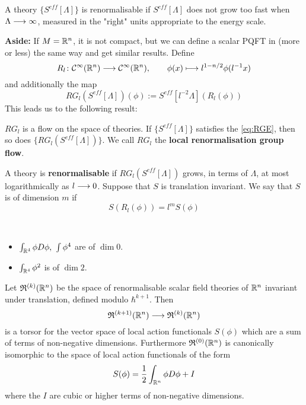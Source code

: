 \begin{principle}
  A theory $\{S^{eff}[\Lambda]\}$ is renormalisable if $S^{eff}[\Lambda]$ does not grow too fast when $\Lambda \longrightarrow \infty$, measured in the "right" units appropriate to the energy scale.
\end{principle}


\textbf{Aside:} If $M = \mathbb{R}^n$, it is not compact, but we can define a scalar PQFT in (more or less) the same way and get similar results. Define
\begin{equation} R_l \colon \Ci(\RR^n) \lra \Ci(\RR^n), \quad \quad \phi(x) \lmap l^{1-n/2} \phi(l^{-1} x)\end{equation}
and additionally the map
\begin{equation} RG_l (S^{eff}[\Lambda]) (\phi) := S^{eff}[l^{-2} \Lambda](R_l(\phi))\end{equation}
This leads us to the following result:

\begin{lem}
  $RG_l$ is a flow on the space of theories. If $ \{S^{eff}[\Lambda]\}$ satisfies the \eqref{eq:RGE}, then so does $\{RG_l(S^{eff}[\Lambda])\}$. We call $RG_l$ the \textbf{local renormalisation group flow}.
\end{lem}


\begin{definition}
  A theory is \textbf{renormalisable} if $RG_l(S^{eff}[\Lambda])$ grows, in terms of $\Lambda$, at most logarithmically as $l \longrightarrow 0$. Suppose that $S$ is translation invariant. We say that $S$ is of dimension $m$ if
  \begin{equation}S(R_l(\phi)) = l^m S(\phi)\end{equation}
\end{definition}

\begin{example}~
  \begin{itemize}
    \item $\int_{\RR^4} \phi D \phi, \ \int \phi^4$ are of $\dim 0$.
    \item $\int_{\RR^4} \phi^2$ is of $\dim 2$.
  \end{itemize}
\end{example}

\begin{theo}
  Let $\mathfrak{R}^{(k)}(\mathbb{R}^n)$ be the space of renormalisable scalar field theories of $\mathbb{R}^n$ invariant under translation, defined modulo $\hbar^{k+1}$. Then
  \begin{equation} \mathfrak{R}^{(k+1)}(\mathbb{R}^n) \longrightarrow \mathfrak{R}^{(k)}(\mathbb{R}^n)\end{equation}
  is a torsor for the vector space of local action functionals $S(\phi)$ which are a sum of terms of non-negative dimensions. Furthermore $\mathfrak{R}^{(0)}(\mathbb{R}^n)$ is canonically isomorphic to the space of local action functionals of the form
  \begin{equation}S(\phi) = \frac{1}{2} \int_{\RR^n} \phi D \phi + I\end{equation}
  where the $I$ are cubic or higher terms of non-negative dimensions.
\end{theo}

